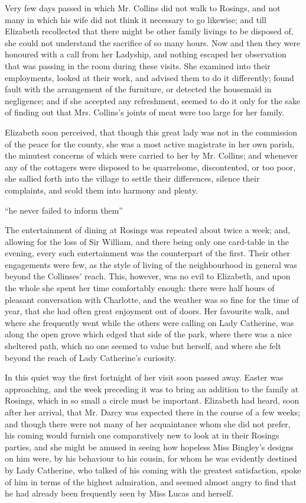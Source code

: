 \documentclass[12pt,openright]{book}
\begin{document}
Very few days passed in which Mr. Collins did not walk to Rosings, and not many in which his wife did not think it necessary to go likewise; and till Elizabeth recollected that there might be other family livings to be disposed of, she could not understand the sacrifice of so many hours. Now and then they were honoured with a call from her Ladyship, and nothing escaped her observation that was passing in the room during these visits. She examined into their employments, looked at their work, and advised them to do it differently; found fault with the arrangement of the furniture, or detected the housemaid in negligence; and if she accepted any refreshment, seemed to do it only for the sake of finding out that Mrs. Collins’s joints of meat were too large for her family.

Elizabeth soon perceived, that though this great lady was not in the commission of the peace for the county, she was a most active magistrate in her own parish, the minutest concerns of which were carried to her by Mr. Collins; and whenever any of the cottagers were disposed to be quarrelsome, discontented, or too poor, she sallied forth into the village to settle their differences, silence their complaints, and scold them into harmony and plenty.

“he never failed to inform them”

The entertainment of dining at Rosings was repeated about twice a week; and, allowing for the loss of Sir William, and there being only one card-table in the evening, every such entertainment was the counterpart of the first. Their other engagements were few, as the style of living of the neighbourhood in general was beyond the Collinses’ reach. This, however, was no evil to Elizabeth, and upon the whole she spent her time comfortably enough: there were half hours of pleasant conversation with Charlotte, and the weather was so fine for the time of year, that she had often great enjoyment out of doors. Her favourite walk, and where she frequently went while the others were calling on Lady Catherine, was along the open grove which edged that side of the park, where there was a nice sheltered path, which no one seemed to value but herself, and where she felt beyond the reach of Lady Catherine’s curiosity.

In this quiet way the first fortnight of her visit soon passed away. Easter was approaching, and the week preceding it was to bring an addition to the family at Rosings, which in so small a circle must be important. Elizabeth had heard, soon after her arrival, that Mr. Darcy was expected there in the course of a few weeks; and though there were not many of her acquaintance whom she did not prefer, his coming would furnish one comparatively new to look at in their Rosings parties, and she might be amused in seeing how hopeless Miss Bingley’s designs on him were, by his behaviour to his cousin, for whom he was evidently destined by Lady Catherine, who talked of his coming with the greatest satisfaction, spoke of him in terms of the highest admiration, and seemed almost angry to find that he had already been frequently seen by Miss Lucas and herself.
\end{document}
